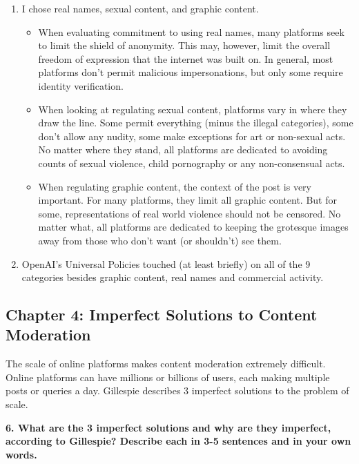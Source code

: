 \documentclass{article}
\begin{document}
\bigskip

\begin{mdframed}
\begin{enumerate}[label=\Alph*.]
\item I chose real names, sexual content, and graphic content.
\begin{itemize}
    \item When evaluating commitment to using real names, many platforms seek to limit the shield of anonymity. This may, however, limit the overall freedom of expression that the internet was built on. In general, most platforms don't permit malicious impersonations, but only some require identity verification. 
    \item When looking at regulating sexual content, platforms vary in where they draw the line. Some permit everything (minus the illegal categories), some don't allow any nudity, some make exceptions for art or non-sexual acts. No matter where they stand, all platforms are dedicated to avoiding counts of sexual violence, child pornography or any non-consensual acts. 
    \item When regulating graphic content, the context of the post is very important. For many platforms, they limit all graphic content. But for some, representations of real world violence should not be censored. No matter what, all platforms are dedicated to keeping the grotesque images away from those who don't want (or shouldn't) see them. 
\end{itemize}
\item OpenAI's Universal Policies touched (at least briefly) on all of the 9 categories besides graphic content, real names and commercial activity.  
\end{enumerate}
\end{mdframed}
\bigskip



\bigskip

\subsection*{Chapter 4: Imperfect Solutions to Content Moderation}

The scale of online platforms makes content moderation extremely difficult. Online platforms can have millions or billions of users, each making multiple posts or queries a day. Gillespie describes 3 imperfect solutions to the problem of scale.

\textbf{6. What are the 3 imperfect solutions and why are they imperfect, according to Gillespie? Describe each in 3-5 sentences and in your own words.}
\end{document}
